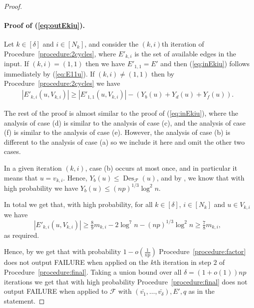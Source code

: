 \documentclass{article}
\DeclareMathOperator{\Des}{Des}
\begin{document}
\begin{proof}
		\paragraph*{Proof of (\ref{eq:outEkiu}).}
		Let $k \in [\delta]$ and $i \in [N_k]$, and consider the $(k,i)$th iteration of Procedure~\ref{procedure:2cycles}, where $E'_{k,i}$ is the set of available edges in the input.
		If $(k,i) = (1,1)$ then we have $E'_{1,1} = E'$ and then (\ref{eq:inEkiu}) follows immediately by (\ref{eq:E11u}).
		If $(k,i) \neq (1,1)$ then by Procedure~\ref{procedure:2cycles} we have
		\begin{align}
		\label{eq:outEk1-Y}
		\left|E'_{k,i}\left(u, V_{k,i} \right) \right| \ge \left|E'_{1,1}\left(u, V_{k,i} \right) \right| - \left(Y_b(u) + Y_d(u) + Y_f(u) \right).
		\end{align}
		
		The rest of the proof is almost similar to the proof of (\ref{eq:inEkiu}), where the analysis of case (d) is similar to the analysis of case (c), and the analysis of case (f) is similar to the analysis of case (e).
		However, the analysis of case (b) is different to the analysis of case (a) so we include it here and omit the other two cases.
		
		In a given iteration $(k,i)$, case (b) occurs at most once, and in particular it means that $u = v_{k,i}$.
		Hence, $Y_b(u) \le \Des_{\mathcal F}(u)$, and by , we know that with high probability we have $Y_b(u) \le (np)^{1/3}\log^2 n$.
		
		In total we get that, with high probability, for all $k \in [\delta]$, $i \in [N_k]$ and $u \in V_{k,i}$ we have
		\[\left|E'_{k,i}\left(u, V_{k,i} \right) \right| \ge \tfrac{8}{9}m_{k,i} - 2\log^7 n - (np)^{1/3}\log^2 n \ge \tfrac{7}{8}m_{k,i}, \]
		as required.
		
		Hence, by  we get that with probability $1 - o\left(\frac{1}{np} \right)$ Procedure~\ref{procedure:factor} does not output FAILURE when applied on the $k$th iteration in step $2$ of Procedure~\ref{procedure:final}.
		Taking a union bound over all $\delta = (1+o(1))np$ iterations we get that with high probability Procedure~\ref{procedure:final} does not output FAILURE when applied to $\mathcal F$ with $(\bar{v_1}, \ldots, \bar{v_{\delta}}), E', q$ as in the statement.
	\end{proof}
	
	
\end{document}
